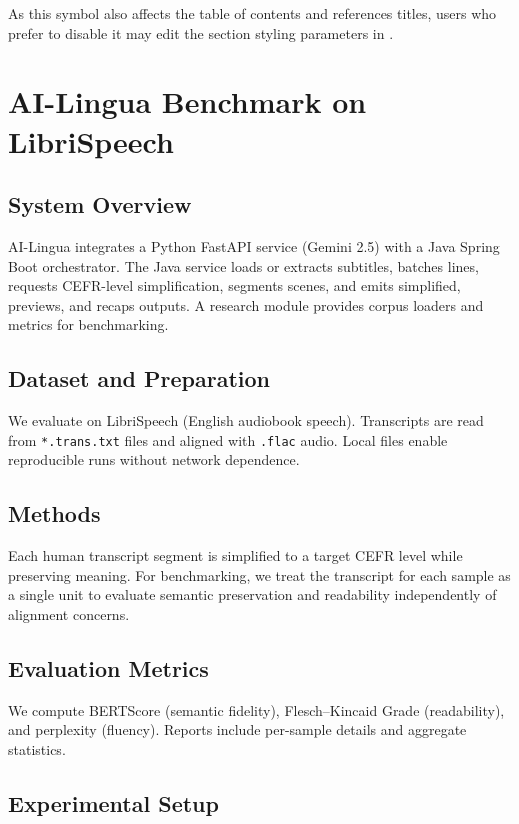 \documentclass[9pt,a4paper,twocolumn,twoside]{rho-class/rho}
\begin{document}
    As this symbol also affects the table of contents and references titles, users who prefer to disable it may edit the section styling parameters in .

\section{AI-Lingua Benchmark on LibriSpeech}

    \subsection{System Overview}
    
        AI-Lingua integrates a Python FastAPI service (Gemini 2.5) with a Java Spring Boot orchestrator. The Java service loads or extracts subtitles, batches lines, requests CEFR-level simplification, segments scenes, and emits simplified, previews, and recaps outputs. A research module provides corpus loaders and metrics for benchmarking.
    
    \subsection{Dataset and Preparation}
    
        We evaluate on LibriSpeech (English audiobook speech). Transcripts are read from \texttt{*.trans.txt} files and aligned with \texttt{.flac} audio. Local files enable reproducible runs without network dependence.
    
    \subsection{Methods}
    
        Each human transcript segment is simplified to a target CEFR level while preserving meaning. For benchmarking, we treat the transcript for each sample as a single unit to evaluate semantic preservation and readability independently of alignment concerns.
    
    \subsection{Evaluation Metrics}
    
        We compute BERTScore (semantic fidelity), Flesch–Kincaid Grade (readability), and perplexity (fluency). Reports include per-sample details and aggregate statistics.
    
    \subsection{Experimental Setup}
    
\end{document}
